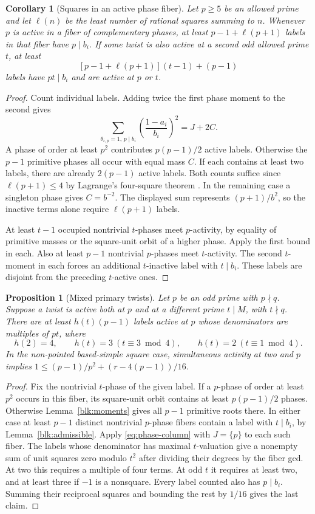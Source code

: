 \documentclass[11pt]{amsart}
\numberwithin{equation}{section}
\newtheorem{proposition}[theorem]{Proposition}
\newtheorem{corollary}[theorem]{Corollary}
\theoremstyle{definition}
\theoremstyle{plain}
\begin{document}
\begin{corollary}[Squares in an active phase fiber]\label{sq:fiber-squares}
Let $p\ge5$ be an allowed prime and let $\ell(n)$ be the least
number of rational squares summing to $n$. Whenever $p$ is active
in a fiber of complementary phases, at least $p-1+\ell(p+1)$
labels in that fiber have $p\mid b_i$. If some twist is also
active at a second odd allowed prime $t$, at least
\[
 [p-1+\ell(p+1)](t-1)+(p-1)
\]
labels have $pt\mid b_i$ and are active at $p$ or $t$.
\end{corollary}
\begin{proof}
Count individual labels. Adding twice the first phase moment to the
second gives
\[
       \sum_{\theta_{i,p}=1,\,p\mid b_i}
                \left(\frac{1-a_i}{b_i}\right)^2=J+2C .
\]
A phase of order at least $p^2$ contributes $p(p-1)/2$ active
labels. Otherwise the $p-1$ primitive phases all occur with equal
mass $C$. If each contains at least two labels, there are already
$2(p-1)$ active labels. Both counts suffice since $\ell(p+1)\le4$
by Lagrange's four-square theorem \cite[Theorem~369]{HardyWright}. In the remaining case a singleton
phase gives $C=b^{-2}$. The displayed sum represents
$(p+1)/b^2$, so the inactive terms alone require $\ell(p+1)$ labels.

At least $t-1$ occupied nontrivial $t$-phases meet $p$-activity,
by equality of primitive masses or the square-unit orbit of a
higher phase. Apply the first bound in each. Also at least $p-1$
nontrivial $p$-phases meet $t$-activity. The second $t$-moment
in each forces an additional $t$-inactive label with $t\mid b_i$.
These labels are disjoint from the preceding $t$-active ones.
\end{proof}

\begin{proposition}[Mixed primary twists]\label{round:mixed}
Let $p$ be an odd prime with $p\nmid q$. Suppose a twist is active
both at $p$ and at a different prime $t\mid M$, with $t\nmid q$.
There are at least $h(t)(p-1)$ labels active at $p$ whose denominators
are multiples of $pt$, where
\[
 h(2)=4,\qquad h(t)=3\ (t\equiv3\bmod4),\qquad
 h(t)=2\ (t\equiv1\bmod4).
\]
In the non-pointed based-simple square case, simultaneous activity at two and $p$ implies
$1\le (p-1)/p^2+(r-4(p-1))/16$.
\end{proposition}
\begin{proof}
Fix the nontrivial $t$-phase of the given label.
If a $p$-phase of order at least $p^2$ occurs in this fiber,
its square-unit orbit contains at least $p(p-1)/2$ phases.
Otherwise Lemma~\ref{blk:moments} gives all $p-1$ primitive roots
there. In either case at least $p-1$ distinct nontrivial $p$-phase
fibers contain a label with $t\mid b_i$, by
Lemma~\ref{blk:admissible}. Apply \eqref{eq:phase-column} with
$J=\{p\}$ to each such fiber. The labels whose denominator has
maximal $t$-valuation give a nonempty sum of unit squares zero
modulo $t^2$ after dividing their degrees by the fiber gcd.
At two this requires a multiple of four terms. At odd $t$ it
requires at least two, and at least three if $-1$ is a nonsquare.
Every label counted also has $p\mid b_i$. Summing their reciprocal
squares and bounding the rest by $1/16$ gives the last claim.
\end{proof}
\end{document}

